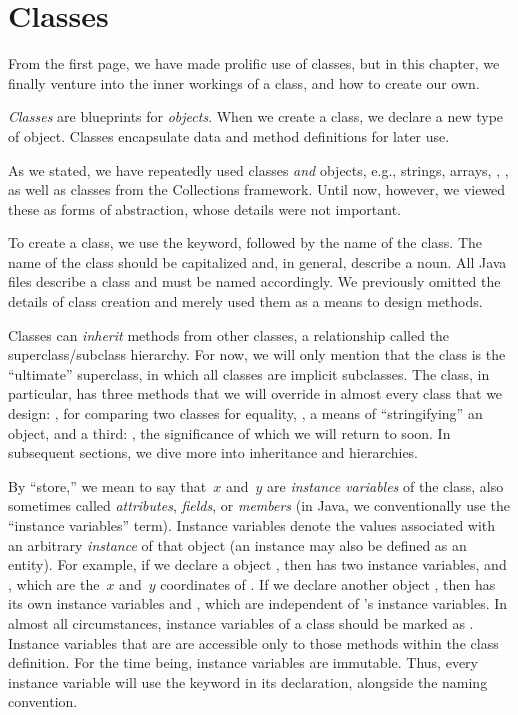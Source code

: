 \section{Classes}
\label{chapter-classes-classes}

From the first page, we have made prolific use of classes, but in this chapter, we finally venture into the inner workings of a class, and how to create our own.

\emph{Classes} are blueprints for \emph{objects}. 
When we create a class, we declare a new type of object. 
Classes encapsulate data and method definitions for later use.

As we stated, we have repeatedly used classes \emph{and} objects, e.g., strings, arrays, , , as well as classes from the Collections framework. 
Until now, however, we viewed these as forms of abstraction, whose details were not important. 

To create a class, we use the  keyword, followed by the name of the class. 
The name of the class should be capitalized and, in general, describe a noun. 
All Java files describe a class and must be named accordingly. 
We previously omitted the details of class creation and merely used them as a means to design methods.

Classes can \emph{inherit} methods from other classes, a relationship called the superclass/subclass hierarchy. 
For now, we will only mention that the  class is the ``ultimate'' superclass, in which all classes are implicit subclasses. 
The  class, in particular, has three methods that we will override in almost every class that we design: , for comparing two classes for equality, , a means of ``stringifying'' an object, and a third: , the significance of which we will return to soon. 
In subsequent sections, we dive more into inheritance and hierarchies.

By ``store,'' we mean to say that~$x$ and~$y$ are \emph{instance variables} of the  class, also sometimes called \emph{attributes}, \emph{fields}, or \emph{members} (in Java, we conventionally use the ``instance variables'' term). 
Instance variables denote the values associated with an arbitrary \emph{instance} of that object (an instance may also be defined as an entity). 
For example, if we declare a  object , then  has two instance variables,  and , which are the~$x$ and~$y$ coordinates of .
If we declare another  object , then  has its own instance variables  and , which are independent of 's instance variables. 
In almost all circumstances, instance variables of a class should be marked as . 
Instance variables that are  are accessible only to those methods within the class definition. 
For the time being, instance variables are immutable. 
Thus, every instance variable will use the  keyword in its declaration, alongside the  naming convention.


